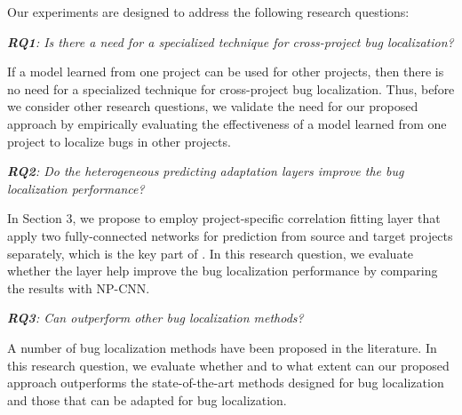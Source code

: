
Our experiments are designed to address the following research questions:

\vspace{0.2cm}\noindent\textit{\textbf{RQ1}: Is there a need for a specialized technique for cross-project bug localization?}

If a model learned from one project can be used for other projects, then there is no need for a specialized technique for cross-project bug localization. Thus, before we consider other research questions, we validate the need for our proposed approach by empirically evaluating the effectiveness of a model learned from one project to localize bugs in other projects.

\vspace{0.2cm}\noindent\textit{\textbf{RQ2}: Do the heterogeneous predicting adaptation layers improve the bug localization performance?}


In Section 3, we propose to employ project-specific correlation fitting layer that apply two fully-connected networks for prediction from source and target projects separately, which is the key part of \TRANPCNN. In this research question, we evaluate whether the layer help improve the bug localization performance by comparing the results with NP-CNN.

\vspace{0.2cm}\noindent\textit{\textbf{RQ3}: Can \TRANPCNN outperform other bug localization methods?}

A number of bug localization methods have been proposed in the literature. In this research question, we evaluate whether and to what extent can our proposed approach \TRANPCNN outperforms the state-of-the-art methods designed for bug localization and those that can be adapted for bug localization. 